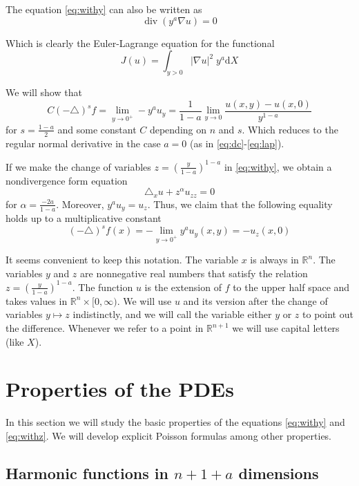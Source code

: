 \documentclass[letterpaper]{article}
\numberwithin{equation}{section}
\newcommand{\abs}[1]{\left\vert#1\right\vert}
\newcommand{\R}{\mathbb R}
\newcommand{\grad} {\nabla}
\newcommand{\lap} {\triangle}
\DeclareMathOperator{\dv}{div}
\newcommand{\Dy}[1]{\dv \left(y^a \grad #1\right)}
\newcommand{\Lz}[1]{\lap_x #1 + z^\alpha #1_{zz}}
\newcommand{\ydd} {\; y^a \mathrm{d}}
\begin{document}
The equation \eqref{eq:withy} can also be written as
\begin{equation}
\Dy u = 0
\end{equation}

Which is clearly the Euler-Lagrange equation for the functional
\begin{equation} \label{eq:functional}
 J(u) = \int_{y>0} \abs{ \grad u }^2 \ydd X 
\end{equation}

We will show that
\[ C (-\lap)^s f = \lim_{y \to 0^+} -y^a u_y = \frac{1}{1-a} \lim_{y \to 0} \frac{u(x,y) - u(x,0)}{y^{1-a}}\]
for $s = \frac{1-a}{2}$ and some constant $C$ depending on $n$ and $s$. Which reduces to the regular normal derivative in the case $a=0$ (as in \eqref{eq:dc}-\eqref{eq:lap}).

If we make the change of variables $z = \left( \frac{y}{1-a} \right)^{1-a}$ in \eqref{eq:withy}, we obtain a nondivergence form equation
\begin{equation}\label{eq:withz}
\Lz u = 0
\end{equation}
for $\alpha = \frac{-2a}{1-a}$. Moreover, $y^a u_y = u_z$. Thus, we claim that the following equality holds up to a multiplicative constant
\[ (-\lap)^s f(x) = -\lim_{y \to 0^+} y^a u_y(x,y) = -u_z(x,0) \]

It seems convenient to keep this notation. The variable $x$ is always in $\R^n$. The variables $y$ and $z$ are nonnegative real numbers that satisfy the relation $z = \left( \frac{y}{1-a} \right)^{1-a}$. The function $u$ is the extension of $f$ to the upper half space and takes values in $\R^n \times [0,\infty)$. We will use $u$ and its version after the change of variables $y \mapsto z$ indistinctly, and we will call the variable either $y$ or $z$ to point out the difference. Whenever we refer to a point in $\R^{n+1}$ we will use capital letters (like $X$).

\section{Properties of the PDEs}
In this section we will study the basic properties of the equations \eqref{eq:withy} and \eqref{eq:withz}. We will develop explicit Poisson formulas among other properties.

\subsection{Harmonic functions in $n+1+a$ dimensions} \label{sec:rsymmetric}
\end{document}
